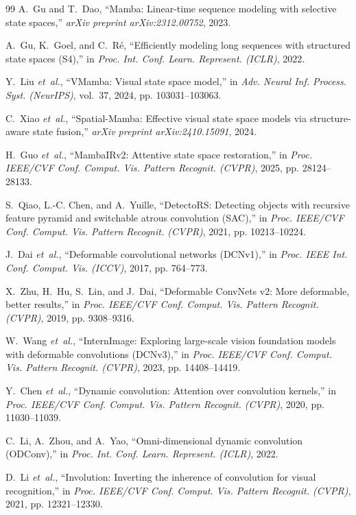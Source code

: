 \documentclass[11pt,a4paper]{article}
\begin{document}
\begin{thebibliography}{99}
A.~Gu and T.~Dao, ``Mamba: Linear-time sequence modeling with selective state spaces,'' \emph{arXiv preprint arXiv:2312.00752}, 2023.

A.~Gu, K.~Goel, and C.~R{\'e}, ``Efficiently modeling long sequences with structured state spaces (S4),'' in \emph{Proc. Int. Conf. Learn. Represent. (ICLR)}, 2022.

Y.~Liu \emph{et~al.}, ``VMamba: Visual state space model,'' in \emph{Adv. Neural Inf. Process. Syst. (NeurIPS)}, vol.~37, 2024, pp. 103031--103063.

C.~Xiao \emph{et~al.}, ``Spatial-Mamba: Effective visual state space models via structure-aware state fusion,'' \emph{arXiv preprint arXiv:2410.15091}, 2024.

H.~Guo \emph{et~al.}, ``MambaIRv2: Attentive state space restoration,'' in \emph{Proc. IEEE/CVF Conf. Comput. Vis. Pattern Recognit. (CVPR)}, 2025, pp. 28124--28133.

S.~Qiao, L.-C. Chen, and A.~Yuille, ``DetectoRS: Detecting objects with recursive feature pyramid and switchable atrous convolution (SAC),'' in \emph{Proc. IEEE/CVF Conf. Comput. Vis. Pattern Recognit. (CVPR)}, 2021, pp. 10213--10224.

J.~Dai \emph{et~al.}, ``Deformable convolutional networks (DCNv1),'' in \emph{Proc. IEEE Int. Conf. Comput. Vis. (ICCV)}, 2017, pp. 764--773.

X.~Zhu, H.~Hu, S.~Lin, and J.~Dai, ``Deformable ConvNets v2: More deformable, better results,'' in \emph{Proc. IEEE/CVF Conf. Comput. Vis. Pattern Recognit. (CVPR)}, 2019, pp. 9308--9316.

W.~Wang \emph{et~al.}, ``InternImage: Exploring large-scale vision foundation models with deformable convolutions (DCNv3),'' in \emph{Proc. IEEE/CVF Conf. Comput. Vis. Pattern Recognit. (CVPR)}, 2023, pp. 14408--14419.

Y.~Chen \emph{et~al.}, ``Dynamic convolution: Attention over convolution kernels,'' in \emph{Proc. IEEE/CVF Conf. Comput. Vis. Pattern Recognit. (CVPR)}, 2020, pp. 11030--11039.

C.~Li, A.~Zhou, and A.~Yao, ``Omni-dimensional dynamic convolution (ODConv),'' in \emph{Proc. Int. Conf. Learn. Represent. (ICLR)}, 2022.

D.~Li \emph{et~al.}, ``Involution: Inverting the inherence of convolution for visual recognition,'' in \emph{Proc. IEEE/CVF Conf. Comput. Vis. Pattern Recognit. (CVPR)}, 2021, pp. 12321--12330.


\end{thebibliography}
\end{document}
